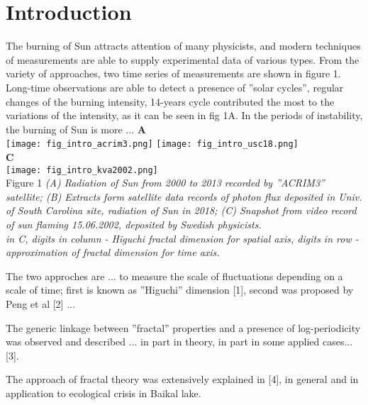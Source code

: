 \documentclass[a4paper]{article}
\begin{document}
\newpage
\section*{Introduction}

The burning of Sun attracts attention of many physicists, and modern techniques of measurements are able to supply experimental data of various types. From the variety of approaches, two time series of measurements are shown in figure 1. Long-time observations are able to detect a presence of ''solar cycles'', regular changes of the burning intensity, 14-years cycle contributed the most to the variations of the intensity, as it can be seen in fig 1A. In the periods of instability, the burning of Sun is more ...
\vskip 12pt
\noindent
{\large{\textbf{A}}} \\
\texttt{[image: fig\_intro\_acrim3.png]}
\texttt{[image: fig\_intro\_usc18.png]}\\
\vskip 12pt
\noindent
{\large{\textbf{C}}}\\
\texttt{[image: fig\_intro\_kva2002.png]}\\
\vskip 12pt
Figure 1 \textit{(A) Radiation of Sun from 2000 to 2013 recorded by ''ACRIM3'' satellite; (B) Extracts form satellite data records of photon flux deposited in Univ. of South Carolina site, radiation of Sun in 2018; (C) Snapshot from video record of sun flaming 15.06.2002, deposited by Swedish physicists.\\ \small{in C,  digits in column - Higuchi fractal dimension for spatial axis, digits in row - approximation of fractal dimension for time axis.}}

The two approches are ... to measure the scale of fluctuations depending on a scale of time; first is known as ''Higuchi'' dimension [1], second was proposed by Peng et al [2] ...

The generic linkage between ''fractal'' properties and a presence of log-periodicity was observed and described ... in part in theory, in part in some applied cases... [3].


The approach of fractal theory was extensively explained in [4], in general and in application to ecological crisis in Baikal lake.
\end{document}
